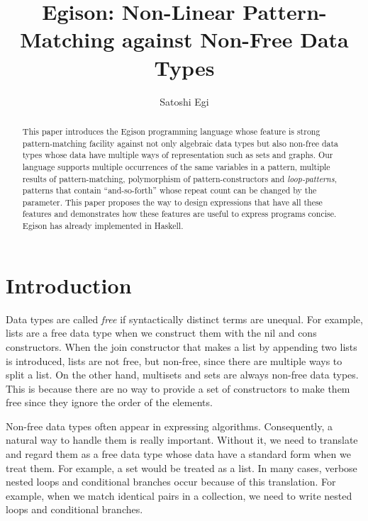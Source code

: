 \documentclass{article}
\begin{document}
\title{Egison: Non-Linear Pattern-Matching against Non-Free Data Types}

\author{Satoshi Egi}


\maketitle

\begin{abstract}
This paper introduces the Egison programming language whose feature is strong pattern-matching facility against not only algebraic data types but also non-free data types whose data have multiple ways of representation such as sets and graphs.
Our language supports multiple occurrences of the same variables in a pattern, multiple results of pattern-matching, polymorphism of pattern-constructors and \textit{loop-patterns}, patterns that contain ``and-so-forth'' whose repeat count can be changed by the parameter.
This paper proposes the way to design expressions that have all these features and demonstrates how these features are useful to express programs concise.
Egison has already implemented in Haskell.
\end{abstract}

\section{Introduction}\label{intro}















Data types are called \textit{free} if syntactically distinct terms are unequal.
For example, lists are a free data type when we construct them with the nil and cons constructors.
When the join constructor that makes a list by appending two lists is introduced, lists are not free, but non-free, since there are multiple ways to split a list.
On the other hand, multisets and sets are always non-free data types.
This is because there are no way to provide a set of constructors to make them free since they ignore the order of the elements.

Non-free data types often appear in expressing algorithms.
Consequently, a natural way to handle them is really important.
Without it, we need to translate and regard them as a free data type whose data have a standard form when we treat them.
For example, a set would be treated as a list.
In many cases, verbose nested loops and conditional branches occur because of this translation.
For example, when we match identical pairs in a collection, we need to write nested loops and conditional branches.
\end{document}
